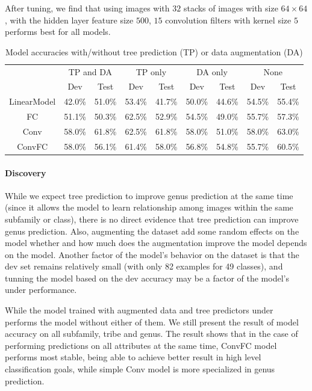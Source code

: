 \documentclass{article}
\begin{document}
After tuning, we find that using images with $32$ stacks of images with size $64\times64$, with the hidden layer feature size $500$, $15$ convolution filters with kernel size $5$ performs best for all models. 

\begin{table}[h]
\centering
\begin{tabular}{ |c|c|c|c|c|c|c|c|c| } 
\hline  
& \multicolumn{2}{|c|}{TP and DA} & \multicolumn{2}{|c|}{TP only} & \multicolumn{2}{|c|}{DA only} & \multicolumn{2}{|c|}{None}\\\cline{2-9}  
 			& Dev    & Test   & Dev    & Test   & Dev    & Test   & Dev    & Test \\\hline\hline 
LinearModel & 42.0\% & 51.0\% & 53.4\% & 41.7\% & 50.0\% & 44.6\% & 54.5\% & 55.4\%\\ 
FC 		 	& 51.1\% & 50.3\% & 62.5\% & 52.9\% & 54.5\% & 49.0\% & 55.7\% & 57.3\%\\ 
Conv 		& 58.0\% & 61.8\% & 62.5\% & 61.8\% & 58.0\% & 51.0\% & 58.0\% & 63.0\%\\
ConvFC 	 	& 58.0\% & 56.1\% & 61.4\% & 58.0\% & 56.8\% & 54.8\% & 55.7\% & 60.5\%\\
\hline
\end{tabular}
\caption{Model accuracies with/without tree prediction (TP) or data augmentation (DA) }
\label{t1}
\end{table}

\paragraph{Discovery} While we expect tree prediction to improve genus prediction at the same time (since it allows the model to learn relationship among images within the same subfamily or class), there is no direct evidence that tree prediction can improve genus prediction. Also, augmenting the dataset add some random effects on the model whether and how much does the augmentation improve the model depends on the model. Another factor of the model's behavior on the dataset is that the dev set remains relatively small (with only 82 examples for 49 classes), and tunning the model based on the dev accuracy may be a factor of the model's under performance.

While the model trained with augmented data and tree predictors under performs the model without either of them. We still present the result of model accuracy on all subfamily, tribe and genus. The result shows that in the case of performing predictions on all attributes at the same time, ConvFC model performs most stable, being able to achieve better result in high level classification goals, while simple Conv model is more specialized in genus prediction. 
\end{document}
